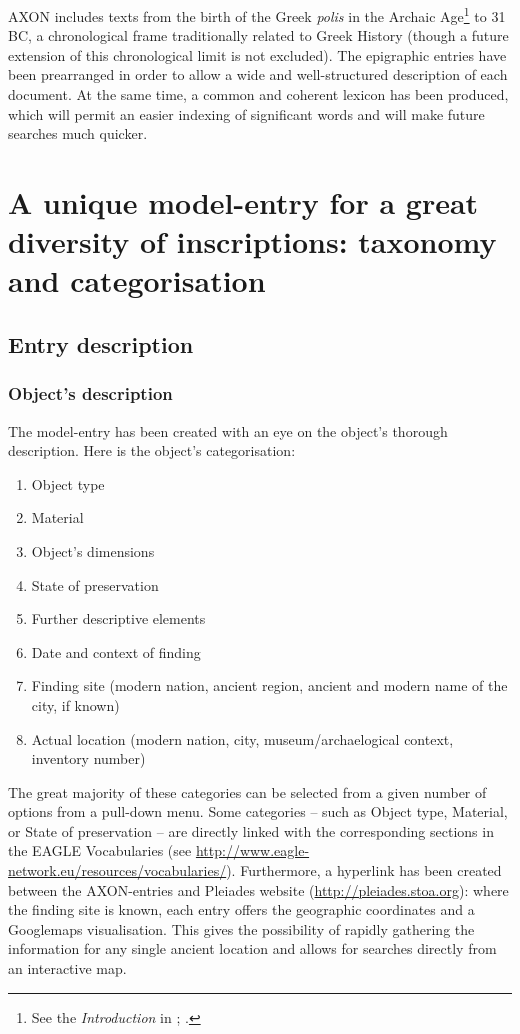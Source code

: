 \documentclass[amsthm,ebook]{saparticle}
\begin{document}
AXON includes texts from the birth of the Greek \emph{polis} in the Archaic Age\footnote{ See the \emph{Introduction} in \citet{nielsen_inventory_2004}; \citet{hansen_polis:_2006}. } to 31 BC, a chronological frame traditionally related to Greek History (though a future
extension of this chronological limit is not excluded). The epigraphic entries have been prearranged in order to allow
a wide and well-structured description of each document. At the same time, a common and coherent lexicon has been
produced, which will permit an easier indexing of significant words and will make future searches much quicker. 




\section{A unique model-entry for a great diversity of inscriptions: taxonomy and categorisation}





\subsection{Entry description}

\subsubsection{Object’s description}


\noindent The model-entry has been created with an eye on the object’s thorough description. Here is the object’s categorisation:

\begin{enumerate}
\renewcommand{\theenumi}{\alph{enumi}}
\item Object type
\item Material
\item Object’s dimensions
\item State of preservation
\item Further descriptive elements
\item Date and context of finding
\item Finding site (modern nation, ancient region, ancient and modern name of the city, if known)
\item Actual location (modern nation, city, museum/archaelogical context, inventory number)
\end{enumerate}
The great majority of these categories can be selected from a given number of options from a pull-down menu. Some
categories – such as Object type, Material, or State of preservation – are directly linked with the corresponding
sections in the EAGLE Vocabularies (see \url{http://www.eagle-network.eu/resources/vocabularies/}). Furthermore, a hyperlink
has been created between the AXON-entries and Pleiades website (\url{http://pleiades.stoa.org}): where the finding site is
known, each entry offers the geographic coordinates and a Googlemaps visualisation. This gives the possibility of
rapidly gathering the information for any single ancient location and allows for searches directly from an interactive
map.
\end{document}
